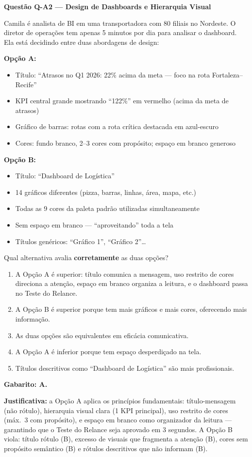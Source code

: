 \begin{SolvedBox}
\textbf{Questão Q-A2 — Design de Dashboards e Hierarquia Visual}

Camila é analista de BI em uma transportadora com 80 filiais no Nordeste. O diretor
de operações tem apenas 5 minutos por dia para analisar o dashboard. Ela está decidindo
entre duas abordagens de design:

\textbf{Opção A:}
\begin{itemize}
  \item Título: ``Atrasos no Q1 2026: 22\% acima da meta — foco na rota Fortaleza–Recife''
  \item KPI central grande mostrando ``122\%'' em vermelho (acima da meta de atrasos)
  \item Gráfico de barras: rotas com a rota crítica destacada em azul-escuro
  \item Cores: fundo branco, 2–3 cores com propósito; espaço em branco generoso
\end{itemize}

\textbf{Opção B:}
\begin{itemize}
  \item Título: ``Dashboard de Logística''
  \item 14 gráficos diferentes (pizza, barras, linhas, área, mapa, etc.)
  \item Todas as 9 cores da paleta padrão utilizadas simultaneamente
  \item Sem espaço em branco — ``aproveitando'' toda a tela
  \item Títulos genéricos: ``Gráfico 1'', ``Gráfico 2''…
\end{itemize}

Qual alternativa avalia \textbf{corretamente} as duas opções?

\begin{enumerate}[label=\Alph*)]
  \item A Opção A é superior: título comunica a mensagem, uso restrito de cores direciona
  a atenção, espaço em branco organiza a leitura, e o dashboard passa no Teste do Relance.
  \item A Opção B é superior porque tem mais gráficos e mais cores, oferecendo mais informação.
  \item As duas opções são equivalentes em eficácia comunicativa.
  \item A Opção A é inferior porque tem espaço desperdiçado na tela.
  \item Títulos descritivos como ``Dashboard de Logística'' são mais profissionais.
\end{enumerate}

\textbf{Gabarito: A.}

\textbf{Justificativa:} a Opção A aplica os princípios fundamentais: título-mensagem (não
rótulo), hierarquia visual clara (1 KPI principal), uso restrito de cores (máx.\ 3 com
propósito), e espaço em branco como organizador da leitura — garantindo que o Teste do
Relance seja aprovado em 3 segundos. A Opção B viola: título rótulo (B), excesso de
visuais que fragmenta a atenção (B), cores sem propósito semântico (B) e rótulos
descritivos que não informam (B).
\end{SolvedBox}

